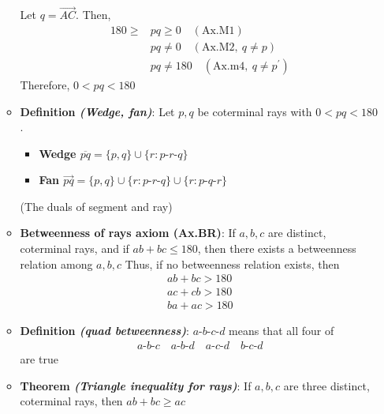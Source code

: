 \documentclass{report}
\begin{document}
\begin{itemize}
\begin{itemize}
                    \bigbreak \noindent 
                    Let $q = \overrightarrow{AC}$. Then, 
                    \begin{align*}
                        180 \geq &pq \geq 0 \quad (\text{Ax.M1})\\
                                 &pq \ne 0 \quad (\text{Ax.M2},\ q\ne p) \\
                                 &pq \ne 180 \quad (\text{Ax.m4},\ q \ne p^{\prime}) 
                    \end{align*}
                    Therefore, $0 < pq < 180$
                \item \textbf{Definition \textit{(Wedge, fan)}}: Let $p,q$ be coterminal rays with $0<pq<180$.
                    \begin{itemize}
                        \item \textbf{Wedge $\overline{pq} = \{p,q\} \cup \{r: p\text{-}r\text{-}q\}$}
                        \item \textbf{Fan $\overrightarrow{pq} = \{p,q\} \cup \{r: p\text{-}r\text{-}q\} \cup \{r: p\text{-}q\text{-}r\}$}
                    \end{itemize}
                    (The duals of segment and ray)
                \item \textbf{Betweenness of rays axiom (Ax.BR)}: If $a,b,c$ are distinct, coterminal rays, and if $ab+bc \leq 180$, then there exists a betweenness relation among $a,b,c$
                    \bigbreak \noindent 
                    Thus, if no betweenness relation exists, then
                    \begin{align*}
                        ab + bc > 180 \\
                        ac + cb > 180 \\
                        ba + ac > 180
                    \end{align*}
                \item \textbf{Definition \textit{(quad betweenness)}}: $ a\text{-}b\text{-}c\text{-}d $ means that all four of 
                    \begin{align*}
                        a\text{-}b\text{-}c \quad a\text{-}b\text{-}d \quad a\text{-}c\text{-}d \quad b\text{-}c\text{-}d
                    \end{align*}
                    are true
                \item \textbf{Theorem \textit{(Triangle inequality for rays)}}: If $a,b,c$ are three distinct, coterminal rays, then $ab + bc \geq ac$

\end{itemize}
\end{itemize}
\end{document}
